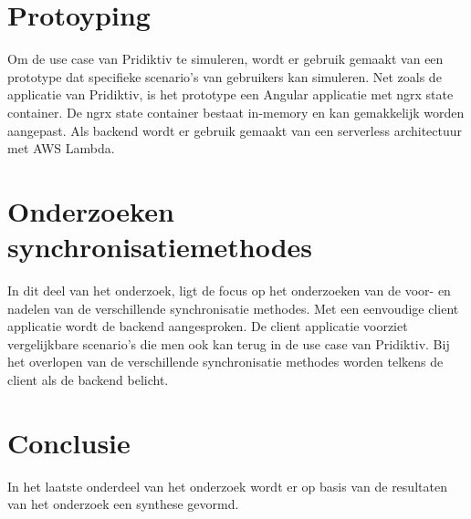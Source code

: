 \section{Protoyping}
Om de use case van Pridiktiv te simuleren, wordt er gebruik gemaakt van een prototype dat specifieke scenario's van gebruikers kan simuleren. Net zoals de applicatie van Pridiktiv, is het prototype een Angular applicatie met ngrx state container. De ngrx state container bestaat in-memory en kan gemakkelijk worden aangepast. Als backend wordt er gebruik gemaakt van een serverless architectuur met AWS Lambda.
\section{Onderzoeken synchronisatiemethodes}
In dit deel van het onderzoek, ligt de focus op het onderzoeken van de voor- en nadelen van de verschillende synchronisatie methodes. Met een eenvoudige client applicatie wordt de backend aangesproken. De client applicatie voorziet vergelijkbare scenario's die men ook kan terug in de use case van Pridiktiv. Bij het overlopen van de verschillende synchronisatie methodes worden telkens de client als de backend belicht.
\section{Conclusie}
In het laatste onderdeel van het onderzoek wordt er op basis van de resultaten van het onderzoek een synthese gevormd.
